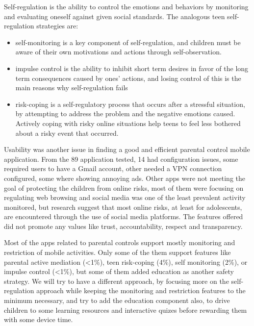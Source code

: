 Self-regulation is the ability to control the emotions and behaviors by monitoring and evaluating oneself against given social standards. The analogous teen self-regulation strategies are:

\begin{itemize}
\item self-monitoring is a key component of self-regulation, and children must be aware of their own motivations and actions through self-observation. \parencite{bandura1991social}
\item impulse control is the ability to inhibit short term desires in favor of the long term consequences caused by ones' actions, and losing control of this is the main reasons why self-regulation fails \parencite{baumeister1996self}
\item risk-coping is a self-regulatory process that occurs after a stressful situation, by attempting to address the problem and the negative emotions caused. Actively coping with risky online situations help teens to feel less bothered about a risky event that occurred. \parencite{d2013cope}
\end{itemize}

Usability was another issue in finding a good and efficient parental control mobile application. From the 89 application tested, 14 had configuration issues, some required users to have a Gmail account, other needed a VPN connection configured, some where showing annoying ads. Other apps were not meeting the goal of protecting the children from online risks, most of them were focusing on regulating web browsing and social media was one of the least prevalent activity monitored, but research suggest that most online risks, at least for adolescents, are encountered through the use of social media platforms. The features offered did not promote any values like trust, accountability, respect and transparency.

Most of the apps related to parental controls support mostly monitoring and restriction of mobile activities. Only some of the them support features like parental active mediation (<1\%), teen risk-coping (4\%), self monitoring (2\%), or impulse control (<1\%), but some of them added education as another safety strategy. We will try to have a different approach, by focusing more on the self-regulation approach while keeping the monitoring and restriction features to the minimum necessary, and try to add the education component also, to drive children to some learning resources and interactive quizes before rewarding them with some device time.

